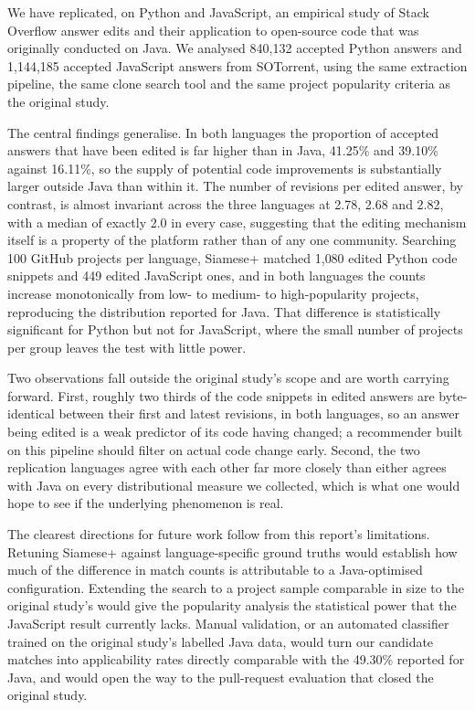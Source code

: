 \documentclass[onecolumn,11pt]{IEEEtran}
\begin{document}
We have replicated, on Python and JavaScript, an empirical study of Stack Overflow answer edits and their application to open-source code that was originally conducted on Java.
We analysed 840{,}132 accepted Python answers and 1{,}144{,}185 accepted JavaScript answers from SOTorrent, using the same extraction pipeline, the same clone search tool and the same project popularity criteria as the original study.

The central findings generalise.
In both languages the proportion of accepted answers that have been edited is far higher than in Java, 41.25\% and 39.10\% against 16.11\%, so the supply of potential code improvements is substantially larger outside Java than within it.
The number of revisions per edited answer, by contrast, is almost invariant across the three languages at 2.78, 2.68 and 2.82, with a median of exactly 2.0 in every case, suggesting that the editing mechanism itself is a property of the platform rather than of any one community.
Searching 100 GitHub projects per language, Siamese+ matched 1{,}080 edited Python code snippets and 449 edited JavaScript ones, and in both languages the counts increase monotonically from low- to medium- to high-popularity projects, reproducing the distribution reported for Java.
That difference is statistically significant for Python but not for JavaScript, where the small number of projects per group leaves the test with little power.

Two observations fall outside the original study's scope and are worth carrying forward.
First, roughly two thirds of the code snippets in edited answers are byte-identical between their first and latest revisions, in both languages, so an answer being edited is a weak predictor of its code having changed; a recommender built on this pipeline should filter on actual code change early.
Second, the two replication languages agree with each other far more closely than either agrees with Java on every distributional measure we collected, which is what one would hope to see if the underlying phenomenon is real.

The clearest directions for future work follow from this report's limitations.
Retuning Siamese+ against language-specific ground truths would establish how much of the difference in match counts is attributable to a Java-optimised configuration.
Extending the search to a project sample comparable in size to the original study's would give the popularity analysis the statistical power that the JavaScript result currently lacks.
Manual validation, or an automated classifier trained on the original study's labelled Java data, would turn our candidate matches into applicability rates directly comparable with the 49.30\% reported for Java, and would open the way to the pull-request evaluation that closed the original study.
\end{document}
